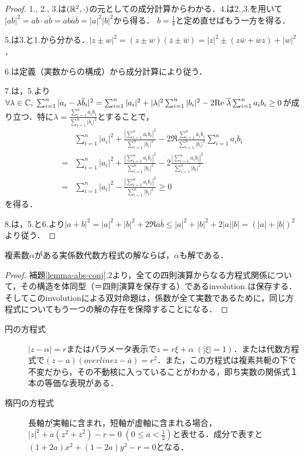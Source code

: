\documentclass[uplatex, dvipdfmx]{jsreport}
\begin{document}
\begin{proof}
    1., 2., 3.は$(\mathbb{R}^2,\cdot)$の元としての成分計算からわかる．4.は2.,3.を用いて$|ab|^2=ab\cdot\overline{ab}=ab\overline{a}\overline{b}=|a|^2|b|^2$から得る．
    $b=\frac{1}{b}$と定め直せばもう一方を得る．

    5.は3.と1.から分かる．$|z\pm w|^2=(z\pm w)(\overline{z}\pm\overline{w})=|z|^2\pm(z\overline{w}+\overline{w}z)+|w|^2$．
    
    6.は定義（実数からの構成）から成分計算により従う．
    
    7.は，5.より$\forall\lambda\in\mathbb{C},\;\sum^n_{i=1}|a_i-\lambda\overline{b}_i|^2=\sum^n_{i=1}|a_i|^2+|\lambda|^2\sum^n_{i=1}|b_i|^2-2\mathrm{Re}\;\overline{\lambda}\sum^n_{i=1}a_ib_i\ge 0$が成り立つ．特に$\lambda=\frac{\sum^n_{i=1}a_ib_i}{\sum^n_{i=1}|b_i|^2}$とすることで，
    \begin{align*}
        &\sum^n_{i=1}|a_i|^2+\frac{\left|\sum^n_{i=1}a_ib_i\right|^2}{\sum^n_{i=1}|b_i|^2}-2\Re\frac{\sum^n_{i=1}\overline{a}_i\overline{b}_i}{\sum^n_{i=1}|b_i|^2}\sum^n_{i=1}a_ib_i\\
        =&\sum^n_{i=1}|a_i|^2+\frac{\left|\sum^n_{i=1}a_ib_i\right|^2}{\sum^n_{i=1}|b_i|^2}-2\frac{\left|\sum^n_{i=1}a_ib_i\right|^2}{\sum^n_{i=1}|b_i|^2}\\
        =&\sum^n_{i=1}|a_i|^2-\frac{\left|\sum^n_{i=1}a_ib_i\right|^2}{\sum^n_{i=1}|b_i|^2}\ge 0
    \end{align*}
    を得る．

    8.は，5.と6.より$|a+b|^2=|a|^2+|b|^2+2\Re a\overline{b}\le |a|^2+|b|^2+2|a||b|=(|a|+|b|)^2$より従う．
\end{proof}

\begin{proposition}
    複素数$\alpha$がある実係数代数方程式の解ならば，$\overline{\alpha}$も解である．
\end{proposition}
\begin{proof}
    補題\ref{lemma-abs-conj}.2より，全ての四則演算からなる方程式関係について，その構造を体同型（＝四則演算を保存する）であるinvolution$\overline{ }$は保存する．
    そしてこのinvolutionによる双対命題は，係数が全て実数であるために，同じ方程式についてもう一つの解の存在を保障することになる．
\end{proof}

\begin{example}[代数方程式]\mbox{}
    \begin{description}
        \item[円の方程式] $|z-\alpha|=r$またはパラメータ表示で$z=r\xi+\alpha\;(|\xi|=1)$．または代数方程式で$(z-a)(overline{z}-\overline{a})=r^2$．また，この方程式は複素共軛の下で不変だから，その不動核に入っていることがわかる，即ち実数の関係式１本の等価な表現がある． 
        \item[楕円の方程式] 長軸が実軸に含まれ，短軸が虚軸に含まれる場合，$|z|^2+a(z^2+\overline{z}^2)-r=0\;(0\le a<\frac{1}{2})$と表せる．成分で表すと$(1+2a)x^2+(1-2a)y^2-r=0$となる． 
    \end{description}
\end{example}
\end{document}
